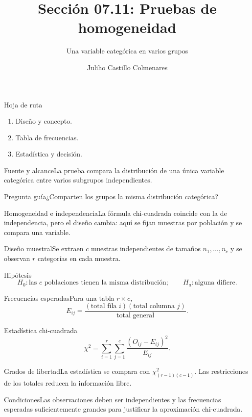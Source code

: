 \documentclass[10pt,aspectratio=169]{beamer}
\title[Pruebas de homogeneidad]{Sección 07.11: Pruebas de homogeneidad}\subtitle{Una variable categórica en varios grupos}
\author[J. Castillo Colmenares]{Juliho Castillo Colmenares}\institute{Tecnológico de Monterrey}\date{}
\begin{document}
\begin{frame}[plain]\titlepage\end{frame}
\begin{frame}{Hoja de ruta}\small\begin{enumerate}\item Diseño y concepto.\item Tabla de frecuencias.\item Estadística y decisión.\end{enumerate}\end{frame}
\begin{frame}{Fuente y alcance}\small La prueba compara la distribución de una única variable categórica entre varios subgrupos independientes.\begin{block}{Pregunta guía}¿Comparten los grupos la misma distribución categórica?\end{block}\end{frame}
\begin{frame}{Homogeneidad e independencia}\small La fórmula chi-cuadrada coincide con la de independencia, pero el diseño cambia: aquí se fijan muestras por población y se compara una variable.\end{frame}
\begin{frame}{Diseño muestral}\small Se extraen $c$ muestras independientes de tamaños $n_1,\ldots,n_c$ y se observan $r$ categorías en cada muestra.\end{frame}
\begin{frame}{Hipótesis}\small\[H_0:\text{las }c\text{ poblaciones tienen la misma distribución};\qquad H_a:\text{alguna difiere}.\]\end{frame}
\begin{frame}{Frecuencias esperadas}\small Para una tabla $r\times c$,\[E_{ij}=\frac{(\text{total fila }i)(\text{total columna }j)}{\text{total general}}.\]\end{frame}
\begin{frame}{Estadística chi-cuadrada}\small\[\chi^2=\sum_{i=1}^{r}\sum_{j=1}^{c}\frac{(O_{ij}-E_{ij})^2}{E_{ij}}.\]\end{frame}
\begin{frame}{Grados de libertad}\small La estadística se compara con $\chi^2_{(r-1)(c-1)}$. Las restricciones de los totales reducen la información libre.\end{frame}
\begin{frame}{Condiciones}\small Las observaciones deben ser independientes y las frecuencias esperadas suficientemente grandes para justificar la aproximación chi-cuadrada.\end{frame}
\end{document}
